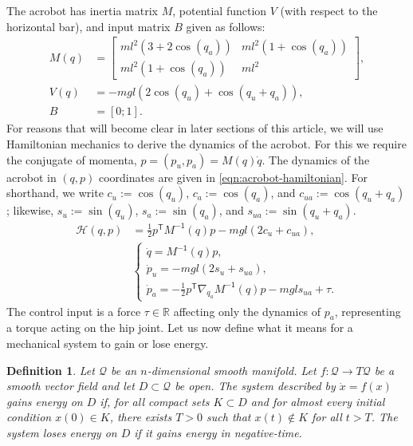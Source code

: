 \documentclass[journal,twoside,web, onecolumn, draftcls]{ieeecolor}
\newtheorem{defn}{Definition} %
\newcommand*{\tpose}{^\mathsf{T}}
\newcommand*{\R}{\mathbb{R}}
\newcommand*{\Minv}{M^\mathsf{-1}}
\begin{document}
The acrobot has inertia matrix 
\(M\), potential function \(V\) (with respect to
the horizontal bar), and input matrix \(B\) given as follows:
\begin{align}\label{eqn:acrobot-inertia}
    M(q) &= \begin{bmatrix}
        ml^2\left(3+2\cos(q_a)\right) & 
        ml^2\left(1+\cos(q_a)\right) \\
        ml^2\left(1+\cos(q_a)\right) &
        ml^2
    \end{bmatrix} 
    , \\
    \label{eqn:acrobot-potential}
    V(q) &= -mgl\left(2\cos(q_u)+\cos(q_u+q_a)\right)
    , \\
    \label{eqn:acrobot-B}
    B &= [0;1]
    .
\end{align}
For reasons that will become clear in later sections of this article, we will
use Hamiltonian mechanics to derive the dynamics of the acrobot. 
For this we require the conjugate of momenta, \(p = (p_u,p_a) = M(q)\dot{q}\).
The dynamics of the acrobot in \((q,p)\) coordinates are given in
\eqref{eqn:acrobot-hamiltonian}.
For shorthand, we write \(c_u := \cos(q_u)\), \(c_a := \cos(q_a)\), and 
\(c_{ua} := \cos(q_u + q_a)\); likewise, \(s_u := \sin(q_u)\), 
\(s_a := \sin(q_a)\), and \(s_{ua} := \sin(q_u + q_a)\).
\begin{align}\label{eqn:acrobot-hamiltonian}
    \mathcal{H}(q,p) &= \frac{1}{2}p\tpose \Minv(q) p -
    mgl\left(2 c_u + c_{ua}\right)
    , \\
     &\begin{cases}
        \dot{q} = \Minv(q) p 
        ,\\
        \dot{p}_u = -mgl\left(2s_u + s_{ua}\right) 
        ,\\
        \dot{p}_a =-\frac{1}{2}p\tpose \nabla_{q_a}\Minv(q) p
        - mgl s_{ua} + \tau.
    \end{cases} \nonumber
\end{align}
The control input is a force \(\tau \in \R\) affecting only the dynamics of
\(p_a\), representing a torque acting on the hip joint.
Let us now define what it means for a mechanical system to gain or lose energy.

\begin{defn}\label{defn:energy-gain}
    Let \(\mathcal{Q}\) be an
    \(n\)-dimensional smooth manifold. 
    Let \(f : \mathcal{Q} \rightarrow T\mathcal{Q}\) be a smooth vector
    field and let \(D \subset \mathcal{Q}\) be open.
    The system described by \(\dot{x} = f(x)\) 
    \textit{gains energy on \(D\)} if, 
    for all compact sets \(K \subset D\) and for almost every initial
    condition \(x(0) \in K\), there exists \(T > 0\) such
    that \(x(t) \notin K\) for all \(t > T\).
    The system \textit{loses energy on \(D\)} if it gains energy in
    negative-time.
\end{defn}
\end{document}
